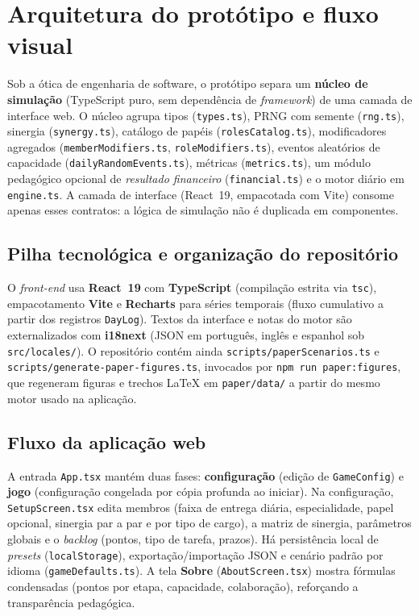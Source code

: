 \section{Arquitetura do protótipo e fluxo visual}
\label{sec:arquitetura}

Sob a ótica de engenharia de software, o protótipo separa um \textbf{núcleo de simulação} (TypeScript puro, sem dependência de \emph{framework}) de uma camada de interface web. O núcleo agrupa tipos (\texttt{types.ts}), PRNG com semente (\texttt{rng.ts}), sinergia (\texttt{synergy.ts}), catálogo de papéis (\texttt{rolesCatalog.ts}), modificadores agregados (\texttt{memberModifiers.ts}, \texttt{roleModifiers.ts}), eventos aleatórios de capacidade (\texttt{dailyRandomEvents.ts}), métricas (\texttt{metrics.ts}), um módulo pedagógico opcional de \emph{resultado financeiro} (\texttt{financial.ts}) e o motor diário em \texttt{engine.ts}. A camada de interface (React~19, empacotada com Vite) consome apenas esses contratos: a lógica de simulação não é duplicada em componentes.

\subsection{Pilha tecnológica e organização do repositório}
O \emph{front-end} usa \textbf{React~19} com \textbf{TypeScript} (compilação estrita via \texttt{tsc}), empacotamento \textbf{Vite} e \textbf{Recharts} para séries temporais (fluxo cumulativo a partir dos registros \texttt{DayLog}). Textos da interface e notas do motor são externalizados com \textbf{i18next} (JSON em português, inglês e espanhol sob \texttt{src/locales/}). O repositório contém ainda \texttt{scripts/paperScenarios.ts} e \texttt{scripts/generate-paper-figures.ts}, invocados por \texttt{npm run paper:figures}, que regeneram figuras e trechos \LaTeX{} em \texttt{paper/data/} a partir do mesmo motor usado na aplicação.

\subsection{Fluxo da aplicação web}
A entrada \texttt{App.tsx} mantém duas fases: \textbf{configuração} (edição de \texttt{GameConfig}) e \textbf{jogo} (configuração congelada por cópia profunda ao iniciar). Na configuração, \texttt{SetupScreen.tsx} edita membros (faixa de entrega diária, especialidade, papel opcional, sinergia par a par e por tipo de cargo), a matriz de sinergia, parâmetros globais e o \emph{backlog} (pontos, tipo de tarefa, prazos). Há persistência local de \emph{presets} (\texttt{localStorage}), exportação/importação JSON e cenário padrão por idioma (\texttt{gameDefaults.ts}). A tela \textbf{Sobre} (\texttt{AboutScreen.tsx}) mostra fórmulas condensadas (pontos por etapa, capacidade, colaboração), reforçando a transparência pedagógica.


